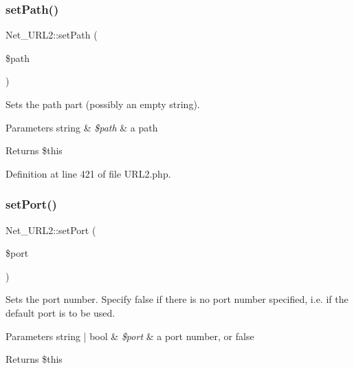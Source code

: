 \mbox{\label{classNet__URL2_aa893e3c250be4842cf21dc6aed0f46b0}} 
\subsubsection{\texorpdfstring{set\+Path()}{setPath()}}
{\footnotesize\ttfamily Net\+\_\+\+U\+R\+L2\+::set\+Path (\begin{DoxyParamCaption}\item[{}]{\$path }\end{DoxyParamCaption})}

Sets the path part (possibly an empty string).


\begin{DoxyParams}[1]{Parameters}
string & {\em \$path} & a path\\
\hline
\end{DoxyParams}
\begin{DoxyReturn}{Returns}
\$this 
\end{DoxyReturn}


Definition at line 421 of file U\+R\+L2.\+php.

\mbox{\label{classNet__URL2_a4086e17a9dc2744b451ed0e5cc6fe113}} 
\subsubsection{\texorpdfstring{set\+Port()}{setPort()}}
{\footnotesize\ttfamily Net\+\_\+\+U\+R\+L2\+::set\+Port (\begin{DoxyParamCaption}\item[{}]{\$port }\end{DoxyParamCaption})}

Sets the port number. Specify false if there is no port number specified, i.\+e. if the default port is to be used.


\begin{DoxyParams}[1]{Parameters}
string | bool & {\em \$port} & a port number, or false\\
\hline
\end{DoxyParams}
\begin{DoxyReturn}{Returns}
\$this 
\end{DoxyReturn}


